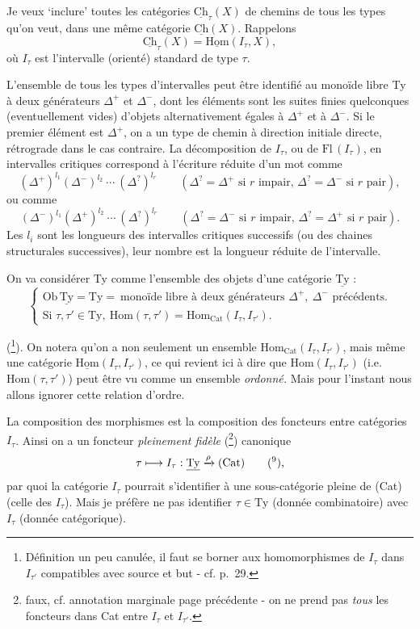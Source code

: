 \documentclass[11pt]{article}
\newcommand{\printedpage}[1]{\marginpar{\footnotesize p.~#1}}
\newcommand{\msp}[1]{\marginpar{\footnotesize [#1]}}
\newcommand{\uHom}{\underline{\mathrm{Hom}}}
\newcommand{\Hom}{\mathrm{Hom}}
\newcommand{\uCh}{\underline{\mathrm{Ch}}}
\newcommand{\Ty}{\mathrm{Ty}}
\newcommand{\uTy}{\underline{\mathrm{Ty}}}
\newcommand{\Cat}{\mathrm{Cat}}
\begin{document}
Je veux ‘inclure’ toutes les catégories $\uCh_\tau(X)$ de chemins de tous les types qu'on veut, dans une même catégorie $\uCh(X)$. Rappelons
\[
\uCh_\tau(X)=\uHom(I_\tau,X),
\]
où $I_\tau$ est l'intervalle (orienté) standard de type $\tau$.

L'ensemble de tous les types d'intervalles
\msp{page 25}
peut être identifié au monoïde libre Ty à deux générateurs $\Delta^+$ et $\Delta^-$, dont les éléments sont les suites finies quelconques (eventuellement vides) d'objets alternativement égales à $\Delta^+$ et à $\Delta^-$. Si le premier élément est $\Delta^+$, on a un type de chemin à direction initiale directe, rétrograde dans le cas contraire. La décomposition de $I_\tau$, ou de $\mathrm{Fl}\,(I_\tau)$, en intervalles critiques correspond à l'écriture réduite d'un mot comme %
\[
(\Delta^+)^{l_1}(\Delta^-)^{l_2}\ \cdots\ (\Delta^?)^{l_r} \qquad (\Delta^?=\Delta^+ \text{ si } r \text{ impair, } \Delta^?=\Delta^- \text{ si } r \text{ pair}),
\]
ou comme
\[
(\Delta^-)^{l_1}(\Delta^+)^{l_2}\ \cdots\ (\Delta^?)^{l_r} \qquad (\Delta^?=\Delta^- \text{ si } r \text{ impair, } \Delta^?=\Delta^+ \text{ si } r \text{ pair}).
\]
Les $l_i$ sont les longueurs des intervalles critiques successifs (ou des chaines structurales successives), leur nombre est la longueur réduite de l'intervalle.

On va considérer Ty comme l'ensemble des objets d'une catégorie $\uTy$ :
\[
\left\{
\begin{array}{l}
\mathrm{Ob}\,\uTy=\Ty=\ \text{monoïde libre à deux générateurs } \Delta^+,\ \Delta^- \text{ précédents.}\\[1ex]
\text{Si } \tau,\tau'\in\Ty,\ \Hom(\tau,\tau')=\Hom_{\Cat}(I_\tau,I_{\tau'}).
\end{array}
\right.
\]

(\footnote[7]{Définition un peu canulée, il faut se borner aux homomorphismes de $I_\tau$ dans $I_{\tau'}$ compatibles avec source et but - cf. p.~29.}). On notera qu'on a non seulement un ensemble $\Hom_{\Cat}(I_\tau,I_{\tau'})$, mais même une catégorie $\uHom(I_\tau,I_{\tau'})$, ce qui revient ici à dire que $\Hom(I_\tau,I_{\tau'})$ (i.e. $\Hom(\tau,\tau')$) peut être vu comme un ensemble \textit{ordonné.} Mais pour l'instant nous allons ignorer cette relation d'ordre.

\msp{page 26}
La composition des morphismes est la composition des foncteurs entre catégories $I_\tau$. Ainsi on a un foncteur \textit{pleinement fidèle} (\footnote[8]{faux, cf. annotation marginale page précédente - on ne prend pas \textit{tous} les foncteurs dans Cat entre $I_\tau$ et $I_{\tau'}$.}) canonique
\[
\tau \longmapsto I_\tau : \uTy \xrightarrow{\rho} (\Cat) \qquad \text{(\footnotemark[9]),}
\]
\printedpage{17}
par quoi la catégorie $I_\tau$ pourrait s'identifier à une sous-catégorie pleine de (Cat) (celle des $I_\tau$). Mais je préfère ne pas identifier $\tau\in\Ty$ (donnée combinatoire) avec $I_\tau$ (donnée catégorique).
\end{document}
